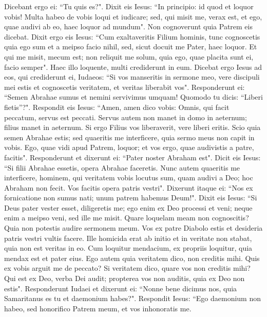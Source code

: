 \begin{biblechapter}
\verse Dicebant ergo ei: “Tu quis es?". Dixit eis Iesus: “In principio: id quod et loquor vobis! 
\verse Multa habeo de vobis loqui et iudicare; sed, qui misit me, verax est, et ego, quae audivi ab eo, haec loquor ad mundum". 
\verse Non cognoverunt quia Patrem eis dicebat. 
\verse Dixit ergo eis Iesus: “Cum exaltaveritis Filium hominis, tunc cognoscetis quia ego sum et a meipso facio nihil, sed, sicut docuit me Pater, haec loquor. 
\verse Et qui me misit, mecum est; non reliquit me solum, quia ego, quae placita sunt ei, facio semper". 
\verse Haec illo loquente, multi crediderunt in eum. 
\verse Dicebat ergo Iesus ad eos, qui crediderunt ei, Iudaeos: “Si vos manseritis in sermone meo, vere discipuli mei estis 
\verse et cognoscetis veritatem, et veritas liberabit vos". 
\verse Responderunt ei: “Semen Abrahae sumus et nemini servivimus umquam! Quomodo tu dicis: “Liberi fietis”?". 
\verse Respondit eis Iesus: “Amen, amen dico vobis: Omnis, qui facit peccatum, servus est peccati. 
\verse Servus autem non manet in domo in aeternum; filius manet in aeternum.  
\verse Si ergo Filius vos liberaverit, vere liberi eritis. 
\verse Scio quia semen Abrahae estis; sed quaeritis me interficere, quia sermo meus non capit in vobis.  
\verse Ego, quae vidi apud Patrem, loquor; et vos ergo, quae audivistis a patre, facitis". 
\verse Responderunt et dixerunt ei: “Pater noster Abraham est". Dicit eis Iesus: “Si filii Abrahae essetis, opera Abrahae faceretis. 
\verse Nunc autem quaeritis me interficere, hominem, qui veritatem vobis locutus sum, quam audivi a Deo; hoc Abraham non fecit. 
\verse Vos facitis opera patris vestri". Dixerunt itaque ei: “Nos ex fornicatione non sumus nati; unum patrem habemus Deum!". 
\verse Dixit eis Iesus: “Si Deus pater vester esset, diligeretis me; ego enim ex Deo processi et veni; neque enim a meipso veni, sed ille me misit. 
\verse Quare loquelam meam non cognoscitis? Quia non potestis audire sermonem meum.  
\verse Vos ex patre Diabolo estis et desideria patris vestri vultis facere. Ille homicida erat ab initio et in veritate non stabat, quia non est veritas in eo. Cum loquitur mendacium, ex propriis loquitur, quia mendax est et pater eius.  
\verse Ego autem quia veritatem dico, non creditis mihi. 
\verse Quis ex vobis arguit me de peccato? Si veritatem dico, quare vos non creditis mihi? 
\verse Qui est ex Deo, verba Dei audit; propterea vos non auditis, quia ex Deo non estis". 
\verse Responderunt Iudaei et dixerunt ei: “Nonne bene dicimus nos, quia Samaritanus es tu et daemonium habes?". 
\verse Respondit Iesus: “Ego daemonium non habeo, sed honorifico Patrem meum, et vos inhonoratis me. 

\end{biblechapter}
